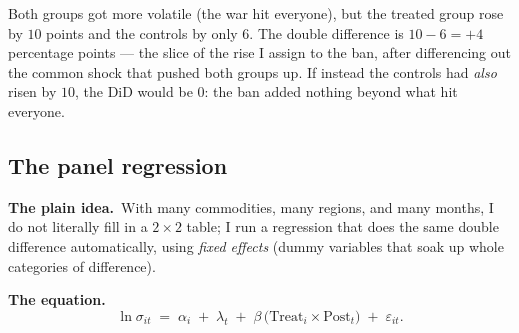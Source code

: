\documentclass[11pt]{article}
\newcommand{\intuit}{\smallskip\noindent\textbf{The plain idea.}\ }
\newcommand{\formula}{\smallskip\noindent\textbf{The equation.}\ }
\begin{document}
Both groups got more volatile (the war hit everyone), but the treated group rose by $10$ points
and the controls by only $6$. The double difference is $10 - 6 = +4$ percentage points --- the
slice of the rise I assign to the ban, after differencing out the common shock that pushed both
groups up. If instead the controls had \emph{also} risen by $10$, the DiD would be $0$: the ban
added nothing beyond what hit everyone.

\subsection{The panel regression}

\intuit With many commodities, many regions, and many months, I do not literally fill in a
$2\times2$ table; I run a regression that does the same double difference automatically, using
\emph{fixed effects} (dummy variables that soak up whole categories of difference).

\formula
\[
\ln \sigma_{it} \;=\; \alpha_i \;+\; \lambda_t \;+\; \beta\,\big(\mathrm{Treat}_i \times \mathrm{Post}_t\big) \;+\; \varepsilon_{it}.
\]
\end{document}
